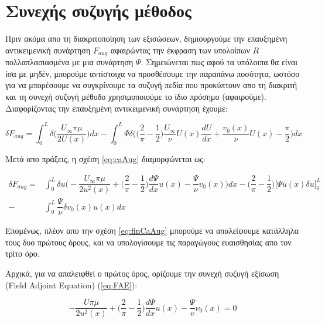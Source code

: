 \section{Συνεχής συζυγής μέθοδος}

Πριν ακόμα απο τη διακριτοποίηση των εξισώσεων, δημιουργούμε την επαυξημένη αντικειμενική συνάρτηση $F_{aug}$ αφαιρώντας την έκφραση των υπολοίπων $R$ πολλαπλασιασμένα με μια συνάρτηση $\Psi$. Σημειώνεται πως αφού τα υπόλοιπα θα είναι ίσα με μηδέν, μπορούμε αντίστοιχα να προσθέσουμε την παραπάνω ποσότητα, ωστόσο για να μπορέσουμε να συγκρίνουμε τα συζυγή πεδία που προκύπτουν απο τη διακριτή και τη συνεχή συζυγή μέθοδο χρησιμοποιούμε το ίδιο πρόσημο (αφαιρούμε). Διαφορίζοντας την επαυξημένη αντικειμενική συνάρτηση έχουμε:

\begin{equation}
   \delta F_{aug} = \displaystyle\int_{0}^{L}\delta\Bigg(\dfrac{U_{\infty}\pi\mu}{2U(x)}\Bigg)dx - \displaystyle\int_{0}^{L}\Psi \delta \Bigg(\Big(\dfrac{2}{\pi}-\dfrac{1}{2}\Big)\dfrac{U_{\infty}}{\nu}U(x)\dfrac{dU}{dx} + \dfrac{v_0(x)}{\nu}U(x) - \dfrac{\pi}{2}\Bigg)dx
    \label{eq:caAug}
\end{equation}

Μετά απο πράξεις, η σχέση \ref{eq:caAug} διαμορφώνεται ως:

\begin{equation}
 \begin{aligned}
    \delta F_{aug} = &\int^L_0\delta u\Bigg(-\dfrac{U_{\infty}\pi\mu}{2u^2(x)} + \Big(\dfrac{2}{\pi} - \dfrac{1}{2}\Big)\dfrac{d\Psi}{dx}u(x) - \dfrac{\Psi}{\nu}v_0(x) \Bigg)dx - \Big(\dfrac{2}{\pi} - \dfrac{1}{2}\Big)\Big[\Psi  u(x)\delta u\Big]_0^L\\
- &\int_0^L\dfrac{\Psi}{\nu}\delta v_0(x)u(x)dx
\end{aligned}   
    \label{eq:finCaAug}
\end{equation}

Επομένως, πλέον απο την σχέση \ref{eq:finCaAug} μπορούμε να απαλείψουμε κατάλληλα τους δυο πρώτους όρους, και να υπολογίσουμε τις παραγώγους ευαισθησίας απο τον τρίτο όρο. 

Αρχικά, για να απαλειφθεί ο πρώτος όρος, ορίζουμε την συνεχή συζυγή εξίσωση (Field Adjoint Equation) (\ref{eq:FAE}):

\begin{equation}
    -\dfrac{U\pi\mu}{2u^2(x)} + \Big(\dfrac{2}{\pi} - \dfrac{1}{2}\Big)\dfrac{d\Psi}{dx}u(x) - \dfrac{\Psi}{v}\nu_0(x) = 0 
    \label{eq:FAE}
\end{equation}

